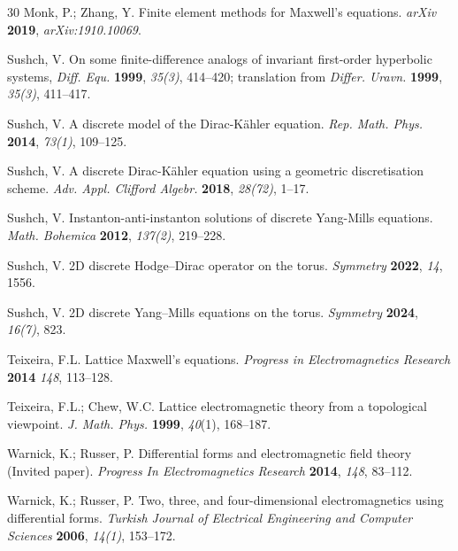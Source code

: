 \documentclass[english]{article}
\theoremstyle{plain}
\theoremstyle{definition}
\theoremstyle{remark}
\numberwithin{equation}{section}
\begin{document}
\begin{thebibliography}{30}
Monk, P.; Zhang,  Y. Finite element methods for Maxwell’s equations.
{\em arXiv} {\bf 2019}, {\em arXiv:1910.10069}.



 Sushch, V.  On some finite-difference analogs of invariant first-order hyperbolic systems, {\em Diff. Equ.} {\bf 1999}, {\em 35(3)},  414--420; translation from
 {\em Differ. Uravn.} {\bf 1999}, {\em 35(3)},  411--417.

 Sushch, V.  A discrete model of the Dirac-K\"{a}hler equation. {\em Rep. Math. Phys.} {\bf 2014}, {\em 73(1)}, 109--125.

 Sushch, V. A discrete Dirac-K\"{a}hler equation using a geometric discretisation scheme.
{\em Adv. Appl. Clifford Algebr.} {\bf 2018}, {\em 28(72)}, 1--17.


  Sushch, V.  Instanton-anti-instanton solutions of discrete Yang-Mills equations. {\em Math. Bohemica}
 {\bf 2012}, {\em 137(2)}, 219--228.

   Sushch, V. 2D discrete Hodge–Dirac operator on the torus. {\em Symmetry} {\bf 2022}, {\em 14}, 1556.

  Sushch, V.  2D discrete Yang–Mills equations on the torus. {\em Symmetry} {\bf 2024}, {\em 16(7)}, 823.


 Teixeira, F.L. Lattice Maxwell's equations. {\em Progress in Electromagnetics Research} {\bf 2014} {\em 148},    113--128.

  Teixeira, F.L.;   Chew, W.C. Lattice electromagnetic theory from a topological viewpoint. {\em J.  Math. Phys.} {\bf 1999}, {\em 40}(1),  168--187.

 Warnick, K.; Russer, P. Differential forms and electromagnetic field theory (Invited paper). {\em Progress In Electromagnetics Research} {\bf 2014}, {\em 148}, 83--112.

Warnick, K.; Russer, P. Two, three, and four-dimensional electromagnetics using differential forms.  {\em Turkish Journal of Electrical Engineering and Computer Sciences} {\bf 2006}, {\em 14(1)}, 153--172.


\end{thebibliography}

 
\end{document}

